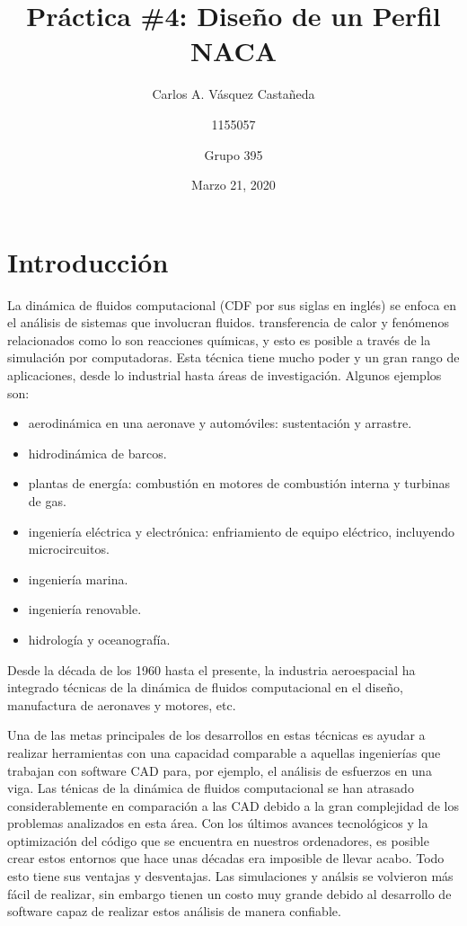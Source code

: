 \documentclass[12pt, letterpaper]{article}
\title{Práctica \#4: Diseño de un Perfil NACA}
\author{Carlos A. Vásquez Castañeda \and 1155057 \and Grupo 395}
\date{Marzo 21, 2020}
\begin{document}
\maketitle

\section*{Introducción}
La dinámica de fluidos computacional (CDF por sus siglas en inglés) se enfoca en el análisis de sistemas que involucran fluidos. transferencia de calor y fenómenos relacionados como lo son reacciones químicas, y esto es posible a través de la simulación por computadoras. Esta técnica tiene mucho poder y un gran rango de aplicaciones, desde lo industrial hasta áreas de investigación. Algunos ejemplos son:

\begin{itemize}
	\item aerodinámica en una aeronave y automóviles: sustentación y arrastre.
	\item hidrodinámica de barcos.
	\item plantas de energía: combustión en motores de combustión interna y turbinas de gas.
	\item ingeniería eléctrica y electrónica: enfriamiento de equipo eléctrico, incluyendo microcircuitos.
	\item ingeniería marina.
	\item ingeniería renovable.
	\item hidrología y oceanografía.
\end{itemize}

Desde la década de los 1960 hasta el presente, la industria aeroespacial ha integrado técnicas de la dinámica de fluidos computacional en el diseño, manufactura de aeronaves y motores, etc. 

Una de las metas principales de los desarrollos en estas técnicas es ayudar a realizar herramientas con una capacidad comparable a aquellas ingenierías que trabajan con software CAD para, por ejemplo,  el análisis de esfuerzos en una viga. Las ténicas de la dinámica de fluidos computacional se han atrasado considerablemente en comparación a las CAD debido a la gran complejidad de los problemas analizados en esta área. Con los últimos avances tecnológicos y la optimización del código que se encuentra en nuestros ordenadores, es posible crear estos entornos que hace unas décadas era imposible de llevar acabo. Todo esto tiene sus ventajas y desventajas. Las simulaciones y análsis se volvieron más fácil de realizar, sin embargo tienen un costo muy grande debido al desarrollo de software capaz de realizar estos análisis de manera confiable.
\end{document}
